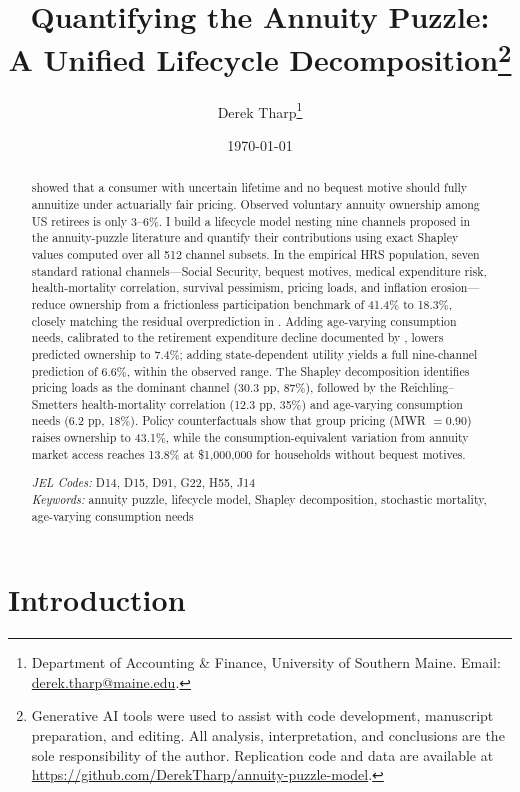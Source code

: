 \documentclass[12pt]{article}
\title{Quantifying the Annuity Puzzle: \\
A Unified Lifecycle Decomposition\thanks{%
Generative AI tools were used to assist with code development, manuscript preparation, and editing. All analysis, interpretation, and conclusions are the sole responsibility of the author. Replication code and data are available at \url{https://github.com/DerekTharp/annuity-puzzle-model}.}}
\author{Derek Tharp\thanks{%
Department of Accounting \& Finance, University of Southern Maine. Email: \href{mailto:derek.tharp@maine.edu}{derek.tharp@maine.edu}.}}
\date{\today}
\begin{document}
\maketitle

\begin{abstract}
\noindent
\citet{yaari1965} showed that a consumer with uncertain lifetime and no bequest motive should fully annuitize under actuarially fair pricing. Observed voluntary annuity ownership among US retirees is only 3--6\%. I build a lifecycle model nesting nine channels proposed in the annuity-puzzle literature and quantify their contributions using exact Shapley values computed over all 512 channel subsets. In the empirical HRS population, seven standard rational channels---Social Security, bequest motives, medical expenditure risk, health-mortality correlation, survival pessimism, pricing loads, and inflation erosion---reduce ownership from a frictionless participation benchmark of 41.4\% to 18.3\%, closely matching the residual overprediction in \citet{pashchenko2013}. Adding age-varying consumption needs, calibrated to the retirement expenditure decline documented by \citet{aguiarhurst2013}, lowers predicted ownership to 7.4\%; adding state-dependent utility yields a full nine-channel prediction of 6.6\%, within the observed range. The Shapley decomposition identifies pricing loads as the dominant channel (30.3 pp, 87\%), followed by the Reichling--Smetters health-mortality correlation (12.3 pp, 35\%) and age-varying consumption needs (6.2 pp, 18\%). Policy counterfactuals show that group pricing (MWR $= 0.90$) raises ownership to 43.1\%, while the consumption-equivalent variation from annuity market access reaches 13.8\% at \$1,000,000 for households without bequest motives.

\bigskip
\noindent
\textit{JEL Codes:} D14, D15, D91, G22, H55, J14 \\
\textit{Keywords:} annuity puzzle, lifecycle model, Shapley decomposition, stochastic mortality, age-varying consumption needs
\end{abstract}

\newpage


\section{Introduction}
\label{sec:intro}
\end{document}
